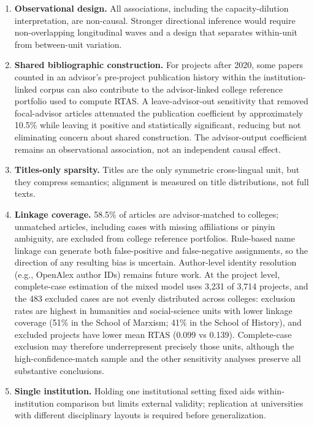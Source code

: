 \documentclass[11pt]{article}
\begin{document}
\begin{enumerate}
\item \textbf{Observational design.} All associations, including the capacity-dilution interpretation, are non-causal. Stronger directional inference would require non-overlapping longitudinal waves and a design that separates within-unit from between-unit variation.

\item \textbf{Shared bibliographic construction.} For projects after 2020, some papers counted in an advisor's pre-project publication history within the institution-linked corpus can also contribute to the advisor-linked college reference portfolio used to compute RTAS. A leave-advisor-out sensitivity that removed focal-advisor articles attenuated the publication coefficient by approximately 10.5\% while leaving it positive and statistically significant, reducing but not eliminating concern about shared construction. The advisor-output coefficient remains an observational association, not an independent causal effect.

\item \textbf{Titles-only sparsity.} Titles are the only symmetric cross-lingual unit, but they compress semantics; alignment is measured on title distributions, not full texts.

\item \textbf{Linkage coverage.} 58.5\% of articles are advisor-matched to colleges; unmatched articles, including cases with missing affiliations or pinyin ambiguity, are excluded from college reference portfolios. Rule-based name linkage can generate both false-positive and false-negative assignments, so the direction of any resulting bias is uncertain. Author-level identity resolution (e.g., OpenAlex author IDs) remains future work. At the project level, complete-case estimation of the mixed model uses 3,231 of 3,714 projects, and the 483 excluded cases are not evenly distributed across colleges: exclusion rates are highest in humanities and social-science units with lower linkage coverage (51\% in the School of Marxism; 41\% in the School of History), and excluded projects have lower mean RTAS (0.099 vs 0.139). Complete-case exclusion may therefore underrepresent precisely those units, although the high-confidence-match sample and the other sensitivity analyses preserve all substantive conclusions.

\item \textbf{Single institution.} Holding one institutional setting fixed aids within-institution comparison but limits external validity; replication at universities with different disciplinary layouts is required before generalization.


\end{enumerate}
\end{document}
